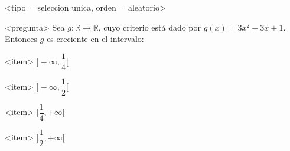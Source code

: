 <tipo = seleccion unica, orden = aleatorio>

<pregunta>
Sea $g:\mathbb R \to \mathbb R$, cuyo criterio est\'a dado por $g(x) = 3x^2 -3x +1$. Entonces $g$ es creciente en el intervalo:


<item>
$\bigg]{-}\infty, \dfrac{1}{4}\bigg[$

<item>
$\bigg]{-}\infty, \dfrac{1}{2}\bigg[$

<item>
$\bigg]\dfrac{1}{4}, +\infty\bigg[$

<item>
$\bigg]\dfrac{1}{2}, +\infty\bigg[$



